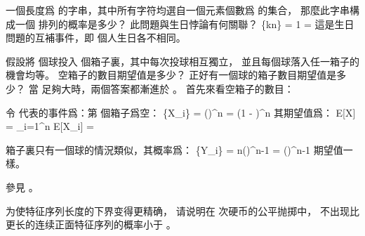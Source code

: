 \startEXERCISE \DIFFICULT
一個長度爲  的字串，其中所有字符均選自一個元素個數爲  的集合，
那麼此字串構成一個  排列的概率是多少？
此問題與生日悖論有何關聯？
\stopEXERCISE
\startANSWER
\startformula
\Pr\{kn\} = 1 \cdot
                                  \cdot
                                  \cdots
      = 
\stopformula
這是生日問題的互補事件，即  個人生日各不相同。
\stopANSWER

\startEXERCISE \DIFFICULT
假設將  個球投入  個箱子裏，其中每次投球相互獨立，
並且每個球落入任一箱子的機會均等。
空箱子的數目期望值是多少？
正好有一個球的箱子數目期望值是多少？
\stopEXERCISE
\startANSWER
當  足夠大時，兩個答案都漸進於 。
首先來看空箱子的數目：

令  代表的事件爲：第  個箱子爲空：
\startformula
\Pr\{X_i\} = \left(\right)^n
                = \left(1 - \right)^n
                \approx {}
\stopformula
其期望值爲：
\startformula
E[X] = \sum_{i=1}^n E[X_i] = 
\stopformula

箱子裏只有一個球的情況類似，其概率爲：
\startformula
\Pr\{Y_i\} = n\left(\right)^{n-1}
                = \left(\right)^{n-1} \approx {}
\stopformula
期望值一樣。

參見 。
\stopANSWER

\startEXERCISE \DIFFICULT
为使特征序列长度的下界变得更精确，
请说明在  次硬币的公平抛掷中，
不出现比  更长的连续正面特征序列的概率小于 。
\stopEXERCISE

\startANSWER
{}
\stopANSWER

\stopsection

